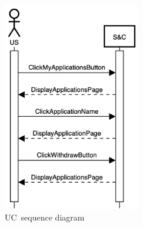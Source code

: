 \begin{figure}[h]
    \centering
    \includegraphics[width=6cm]{images/sequence-diagrams/student-withdraws-application.png}
    \caption{UC\theuc\ sequence diagram}
\end{figure}


